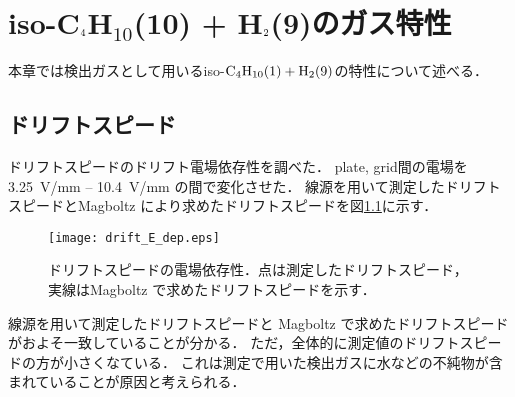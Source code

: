 \documentclass[../master]{subfiles}
\begin{document}
\chapter{iso-C$_{\text 4}$H$_{\text{10}}$(10) + H$_{\text 2}$(9)のガス特性}
本章では検出ガスとして用いるiso-$\rm C_{4}H_{10} (1) + H_{2} (9)$の特性について述べる．
\section{ドリフトスピード}
ドリフトスピードのドリフト電場依存性を調べた．
plate, grid間の電場を\SI{3.25}{\volt/\milli\metre} -- \SI{10.4}{\volt/\milli\metre} の間で変化させた．
線源を用いて測定したドリフトスピードとMagboltz により求めたドリフトスピードを図\ref{fig::drift_speed_E_dep}に示す．
\begin{figure}
  \centering
  \texttt{[image: drift\_E\_dep.eps]}
  \caption{ドリフトスピードの電場依存性．点は測定したドリフトスピード，実線はMagboltz で求めたドリフトスピードを示す．}
  \label{fig::drift_speed_E_dep}
\end{figure}
線源を用いて測定したドリフトスピードと Magboltz で求めたドリフトスピードがおよそ一致していることが分かる．
ただ，全体的に測定値のドリフトスピードの方が小さくなている．
これは測定で用いた検出ガスに水などの不純物が含まれていることが原因と考えられる．
\end{document}
